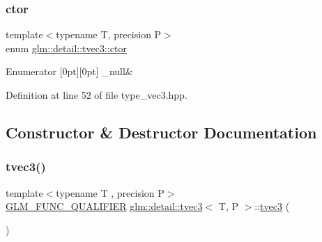 \subsubsection{\texorpdfstring{ctor}{ctor}}
{\footnotesize\ttfamily template$<$typename T, precision P$>$ \\
enum \hyperlink{structglm_1_1detail_1_1tvec3_a370bdb3bb793461504b1387daec78083}{glm\+::detail\+::tvec3\+::ctor}}

\begin{DoxyEnumFields}{Enumerator}
[0pt][0pt]{}\mbox{\label{structglm_1_1detail_1_1tvec3_a370bdb3bb793461504b1387daec78083a3aebaa53efa0b8ea65cd3daeeb23593f}} 
\+\_\+null&\\
\hline

\end{DoxyEnumFields}


Definition at line 52 of file type\+\_\+vec3.\+hpp.



\subsection{Constructor \& Destructor Documentation}
\mbox{\label{structglm_1_1detail_1_1tvec3_a510b6aef2ca2564fda377a9aa4249545}} 
\subsubsection{\texorpdfstring{tvec3()}{tvec3()}\hspace{0.1cm}{\footnotesize\ttfamily [1/17]}}
{\footnotesize\ttfamily template$<$typename T , precision P$>$ \\
\hyperlink{setup_8hpp_a33fdea6f91c5f834105f7415e2a64407}{G\+L\+M\+\_\+\+F\+U\+N\+C\+\_\+\+Q\+U\+A\+L\+I\+F\+I\+ER} \hyperlink{structglm_1_1detail_1_1tvec3}{glm\+::detail\+::tvec3}$<$ T, P $>$\+::\hyperlink{structglm_1_1detail_1_1tvec3}{tvec3} (\begin{DoxyParamCaption}{ }\end{DoxyParamCaption})}



